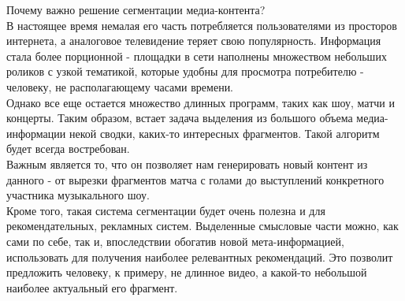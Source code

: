 \documentclass[../body.tex]{subfiles}
\begin{document}
	Почему важно решение сегментации медиа-контента?\\ В настоящее время немалая его часть потребляется пользователями из просторов интернета, а аналоговое телевидение теряет свою популярность. Информация стала более порционной - площадки в сети наполнены множеством небольших роликов с узкой тематикой, которые удобны для просмотра потребителю - человеку, не располагающему часами времени.\\
	Однако все еще остается множество длинных программ, таких как шоу, матчи и концерты. Таким образом, встает задача выделения из большого объема медиа-информации некой сводки, каких-то интересных фрагментов. Такой алгоритм будет всегда востребован.\\
	Важным является то, что он позволяет нам генерировать новый контент из данного - от вырезки фрагментов матча с голами до выступлений конкретного участника музыкального шоу.\\
	Кроме того, такая система сегментации будет очень полезна и для рекомендательных, рекламных систем. Выделенные смысловые части можно, как сами по себе, так и, впоследствии обогатив новой мета-информацией, использовать для  получения наиболее релевантных рекомендаций. Это позволит предложить человеку, к примеру, не длинное видео, а какой-то небольшой наиболее актуальный его фрагмент.
	
\end{document}
